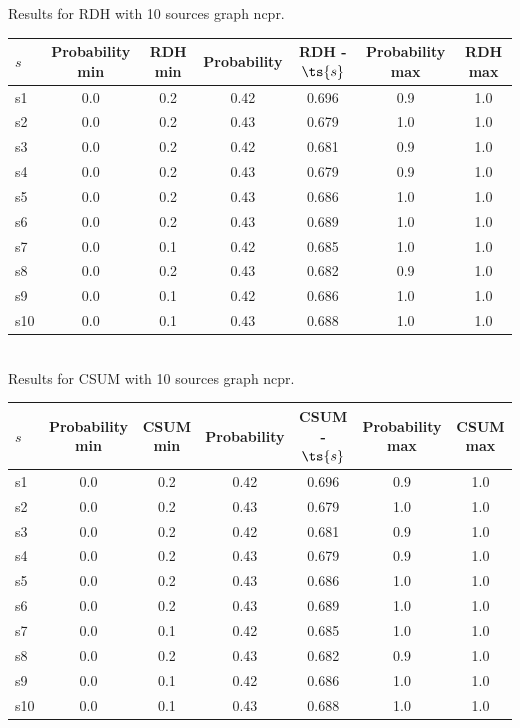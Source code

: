 \documentclass{article}
\begin{document}
\noindent Results for RDH with 10 sources graph ncpr.

\noindent\begin{tabular}{|l|c|c|c|c|c|c|}
\hline
$s$& Probability min & RDH min & Probability & RDH - $\ts{s}$ & Probability max & RDH max\\
\hline
s1 &0.0 & 0.2 & 0.42 & 0.696 & 0.9 & 1.0\\
\hline
s2 &0.0 & 0.2 & 0.43 & 0.679 & 1.0 & 1.0\\
\hline
s3 &0.0 & 0.2 & 0.42 & 0.681 & 0.9 & 1.0\\
\hline
s4 &0.0 & 0.2 & 0.43 & 0.679 & 0.9 & 1.0\\
\hline
s5 &0.0 & 0.2 & 0.43 & 0.686 & 1.0 & 1.0\\
\hline
s6 &0.0 & 0.2 & 0.43 & 0.689 & 1.0 & 1.0\\
\hline
s7 &0.0 & 0.1 & 0.42 & 0.685 & 1.0 & 1.0\\
\hline
s8 &0.0 & 0.2 & 0.43 & 0.682 & 0.9 & 1.0\\
\hline
s9 &0.0 & 0.1 & 0.42 & 0.686 & 1.0 & 1.0\\
\hline
s10 &0.0 & 0.1 & 0.43 & 0.688 & 1.0 & 1.0\\
\hline
\end{tabular}\\

\noindent Results for CSUM with 10 sources graph ncpr.

\noindent\begin{tabular}{|l|c|c|c|c|c|c|}
\hline
$s$& Probability min & CSUM min & Probability & CSUM - $\ts{s}$ & Probability max & CSUM max\\
\hline
s1 &0.0 & 0.2 & 0.42 & 0.696 & 0.9 & 1.0\\
\hline
s2 &0.0 & 0.2 & 0.43 & 0.679 & 1.0 & 1.0\\
\hline
s3 &0.0 & 0.2 & 0.42 & 0.681 & 0.9 & 1.0\\
\hline
s4 &0.0 & 0.2 & 0.43 & 0.679 & 0.9 & 1.0\\
\hline
s5 &0.0 & 0.2 & 0.43 & 0.686 & 1.0 & 1.0\\
\hline
s6 &0.0 & 0.2 & 0.43 & 0.689 & 1.0 & 1.0\\
\hline
s7 &0.0 & 0.1 & 0.42 & 0.685 & 1.0 & 1.0\\
\hline
s8 &0.0 & 0.2 & 0.43 & 0.682 & 0.9 & 1.0\\
\hline
s9 &0.0 & 0.1 & 0.42 & 0.686 & 1.0 & 1.0\\
\hline
s10 &0.0 & 0.1 & 0.43 & 0.688 & 1.0 & 1.0\\
\hline
\end{tabular}\\
\end{document}
